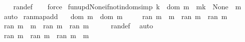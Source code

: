 \begin{isabellebody}
%
\isadelimproof
\ \ %
\endisadelimproof
%
\isatagproof
{}\isamarkupfalse%
\ ran{\isacharunderscore}{\kern0pt}def\isanewline
\ \ \isamarkupfalse%
\ force%
\endisatagproof
{\isafoldproof}%
%
\isadelimproof
\isanewline
%
\endisadelimproof
\isanewline
{}\isamarkupfalse%
\ fun{\isacharunderscore}{\kern0pt}upd{\isacharunderscore}{\kern0pt}None{\isacharunderscore}{\kern0pt}if{\isacharunderscore}{\kern0pt}notin{\isacharunderscore}{\kern0pt}dom{\isacharbrackleft}{\kern0pt}simp{\isacharbrackright}{\kern0pt}{\isacharcolon}{\kern0pt}\ {\isachardoublequoteopen}k\ {\isasymnotin}\ dom\ m\ {\isasymLongrightarrow}\ m{\isacharparenleft}{\kern0pt}k\ {\isacharcolon}{\kern0pt}{\isacharequal}{\kern0pt}\ None{\isacharparenright}{\kern0pt}\ {\isacharequal}{\kern0pt}\ m{\isachardoublequoteclose}\isanewline
%
\isadelimproof
\ \ %
\endisadelimproof
%
\isatagproof
{}\isamarkupfalse%
\ auto%
\endisatagproof
{\isafoldproof}%
%
\isadelimproof
\isanewline
%
\endisadelimproof
\isanewline
{}\isamarkupfalse%
\ ran{\isacharunderscore}{\kern0pt}map{\isacharunderscore}{\kern0pt}add{\isacharcolon}{\kern0pt}\isanewline
\ \ \ {\isachardoublequoteopen}dom\ m{}\ {\isasyminter}\ dom\ m{}\ {\isacharequal}{\kern0pt}\ {\isacharbraceleft}{\kern0pt}{\isacharbraceright}{\kern0pt}{\isachardoublequoteclose}\isanewline
\ \ \ {\isachardoublequoteopen}ran\ {\isacharparenleft}{\kern0pt}m{}\ {\isacharplus}{\kern0pt}{\isacharplus}{\kern0pt}\ m{}{\isacharparenright}{\kern0pt}\ {\isacharequal}{\kern0pt}\ ran\ m{}\ {\isasymunion}\ ran\ m{}{\isachardoublequoteclose}\isanewline
%
\isadelimproof
%
\endisadelimproof
%
\isatagproof
{}\isamarkupfalse%
\isanewline
\ \ \isamarkupfalse%
\ {\isachardoublequoteopen}ran\ {\isacharparenleft}{\kern0pt}m{}\ {\isacharplus}{\kern0pt}{\isacharplus}{\kern0pt}\ m{}{\isacharparenright}{\kern0pt}\ {\isasymsubseteq}\ ran\ m{}\ {\isasymunion}\ ran\ m{}{\isachardoublequoteclose}\isanewline
\ \ \ \ \isamarkupfalse%
\ ran{\isacharunderscore}{\kern0pt}def\ \isamarkupfalse%
\ auto\isanewline
{}\isamarkupfalse%
\isanewline
\ \ \isamarkupfalse%
\ {\isachardoublequoteopen}ran\ m{}\ {\isasymunion}\ ran\ m{}\ {\isasymsubseteq}\ ran\ {\isacharparenleft}{\kern0pt}m{}\ {\isacharplus}{\kern0pt}{\isacharplus}{\kern0pt}\ m{}{\isacharparenright}{\kern0pt}{\isachardoublequoteclose}\isanewline

\end{isabellebody}
